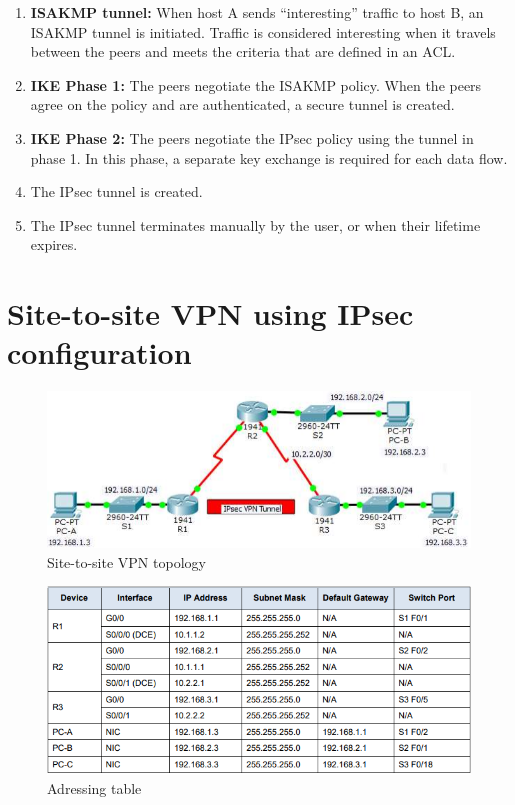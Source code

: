 \begin{enumerate}
\item \textbf{ISAKMP tunnel:}  When host A sends ``interesting'' traffic to host B, an ISAKMP tunnel is initiated. Traffic is considered interesting when it travels between the peers and meets the criteria that are defined in an ACL.

\item \textbf{IKE Phase 1:} The peers negotiate the ISAKMP policy. When the peers agree on the policy and are authenticated, a secure tunnel is created.

\item \textbf{IKE Phase 2:} The peers negotiate the IPsec policy using the tunnel in phase 1. In this phase, a separate key exchange is required for each data flow.

\item The IPsec tunnel is created.

\item The IPsec tunnel terminates manually by the user, or when their lifetime expires.
\end{enumerate}

\section{Site-to-site VPN using IPsec configuration}

\begin{figure}[hbtp]
\caption{Site-to-site VPN topology}\label{VPNtopolgy}
\centering
\includegraphics[scale=0.8]{pictures/VPNtopolgy.PNG}
\end{figure}


\begin{figure}[hbtp]
\caption{Adressing table}\label{AddressTable}
\centering
\includegraphics[scale=0.8]{pictures/AddressTable.PNG}
\end{figure}


